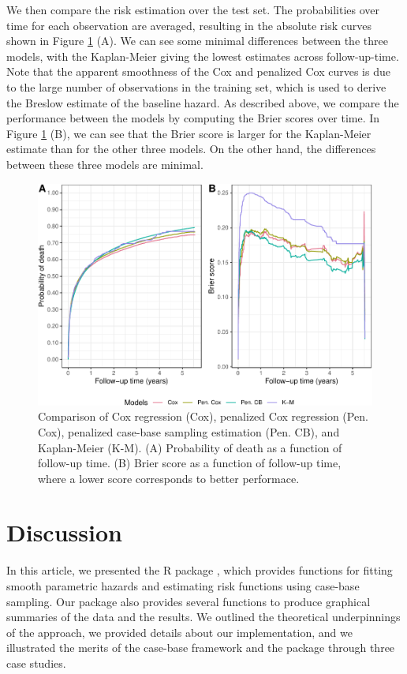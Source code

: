 We then compare the risk estimation over the test set. The probabilities over time for each observation are averaged, resulting in the absolute risk curves shown in Figure \ref{fig:cs3FinalBrier} (A). We can see some minimal differences between the three models, with the Kaplan-Meier giving the lowest estimates across follow-up-time. Note that the apparent smoothness of the Cox and penalized Cox curves is due to the large number of observations in the training set, which is used to derive the Breslow estimate of the baseline hazard. As described above, we compare the performance between the models by computing the Brier scores over time. In Figure \ref{fig:cs3FinalBrier} (B), we can see that the Brier score is larger for the Kaplan-Meier estimate than for the other three models. On the other hand, the differences between these three models are minimal.

\begin{figure}[ht]
\includegraphics[width=\textwidth,keepaspectratio=true]{./cs3FinalBrier-1} \caption{Comparison of Cox regression (Cox), penalized Cox regression (Pen. Cox), penalized case-base sampling estimation (Pen. CB), and Kaplan-Meier (K-M). (A)  Probability of death as a function of follow-up time. (B) Brier score as a function of follow-up time, where a lower score corresponds to better performace.}\label{fig:cs3FinalBrier}
\end{figure}

\hypertarget{discussion}{%
\section{Discussion}\label{discussion}}

In this article, we presented the R package , which provides functions for fitting smooth parametric hazards and estimating risk functions using case-base sampling. Our package also provides several functions to produce graphical summaries of the data and the results. We outlined the theoretical underpinnings of the approach, we provided details about our implementation, and we illustrated the merits of the case-base framework and the package through three case studies.

